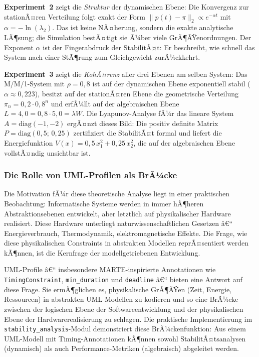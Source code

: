 ﻿\documentclass[a4paper,12pt]{scrreprt}
\theoremstyle{definition}
\begin{document}
\textbf{Experiment~2} zeigt die \emph{Struktur} der dynamischen Ebene:
Die Konvergenz zur stationÃ¤ren Verteilung folgt exakt der Form
$\|p(t) - \pi\|_2 \propto e^{-\alpha t}$ mit $\alpha = -\ln(\lambda_2)$.
Das ist keine NÃ¤herung, sondern die exakte analytische LÃ¶sung; die
Simulation bestÃ¤tigt sie Ã¼ber viele GrÃ¶ÃŸenordnungen.  Der Exponent $\alpha$
ist der Fingerabdruck der StabilitÃ¤t: Er beschreibt, wie schnell das System
nach einer StÃ¶rung zum Gleichgewicht zurÃ¼ckkehrt.

\textbf{Experiment~3} zeigt die \emph{KohÃ¤renz} aller drei Ebenen am selben
System: Das M/M/1-System mit $\rho = 0{,}8$ ist auf der dynamischen Ebene
exponentiell stabil ($\alpha \approx 0{,}223$), besitzt auf der stationÃ¤ren
Ebene die geometrische Verteilung $\pi_n = 0{,}2 \cdot 0{,}8^n$ und erfÃ¼llt
auf der algebraischen Ebene $L = 4{,}0 = 0{,}8 \cdot 5{,}0 = \lambda W$.
Die Lyapunov-Analyse fÃ¼r das lineare System $A = \text{diag}(-1,-2)$
ergÃ¤nzt dieses Bild: Die positiv definite Matrix $P = \text{diag}(0{,}5;\,
0{,}25)$ zertifiziert die StabilitÃ¤t formal und liefert die Energiefunktion
$V(x) = 0{,}5\,x_1^2 + 0{,}25\,x_2^2$, die auf der algebraischen Ebene
vollstÃ¤ndig unsichtbar ist.

\subsubsection{Die Rolle von UML-Profilen als BrÃ¼cke}

Die Motivation fÃ¼r diese theoretische Analyse liegt in einer praktischen
Beobachtung: Informatische Systeme werden in immer hÃ¶heren
Abstraktionsebenen entwickelt, aber letztlich auf physikalischer Hardware
realisiert.  Diese Hardware unterliegt naturwissenschaftlichen Gesetzen â€“
Energieverbrauch, Thermodynamik, elektromagnetische Effekte.  Die Frage,
wie diese physikalischen Constraints in abstrakten Modellen reprÃ¤sentiert
werden kÃ¶nnen, ist die Kernfrage der modellgetriebenen Entwicklung.

UML-Profile â€“ insbesondere MARTE-inspirierte Annotationen wie
\texttt{TimingConstraint}, \texttt{min\_duration} und \texttt{deadline} â€“
bieten eine Antwort auf diese Frage.  Sie ermÃ¶glichen es, physikalische
GrÃ¶ÃŸen (Zeit, Energie, Ressourcen) in abstrakten UML-Modellen zu kodieren
und so eine BrÃ¼cke zwischen der logischen Ebene der Softwareentwicklung
und der physikalischen Ebene der Hardwarerealisierung zu schlagen.  Die
praktische Implementierung im \texttt{stability\_analysis}-Modul
demonstriert diese BrÃ¼ckenfunktion: Aus einem UML-Modell mit
Timing-Annotationen kÃ¶nnen sowohl StabilitÃ¤tsanalysen (dynamisch) als auch
Performance-Metriken (algebraisch) abgeleitet werden.
\end{document}
